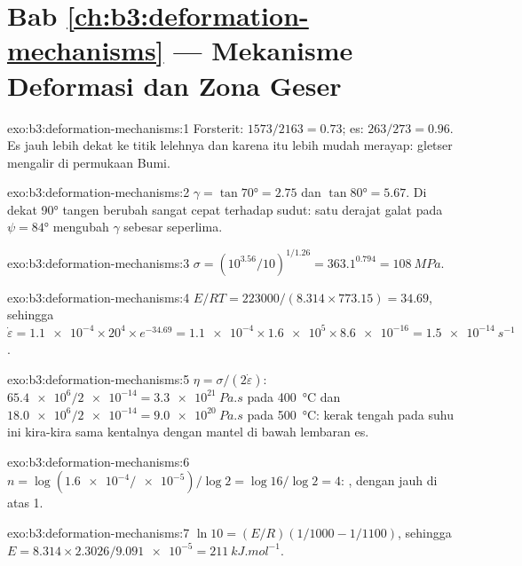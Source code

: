 \section*{Bab \ref{ch:b3:deformation-mechanisms} --- Mekanisme Deformasi dan Zona Geser}

\begin{solution}{exo:b3:deformation-mechanisms:1}
Forsterit: $1573/2163 = 0.73$; es: $263/273 = 0.96$. Es jauh lebih dekat ke
titik lelehnya dan karena itu lebih mudah merayap: gletser mengalir di
permukaan Bumi.
\end{solution}

\begin{solution}{exo:b3:deformation-mechanisms:2}
$\gamma = \tan\ang{70} = 2.75$ dan $\tan\ang{80} = 5.67$. Di dekat \ang{90}
tangen berubah sangat cepat terhadap sudut: satu derajat galat pada $\psi =
\ang{84}$ mengubah $\gamma$ sebesar seperlima.
\end{solution}

\begin{solution}{exo:b3:deformation-mechanisms:3}
$\sigma = (10^{3.56}/10)^{1/1.26} = 363.1^{0.794} = \qty{108}{MPa}$.
\end{solution}

\begin{solution}{exo:b3:deformation-mechanisms:4}
$E/RT = 223000/(8.314\times773.15) = 34.69$, sehingga $\dot\varepsilon =
\num{1.1e-4}\times20^4\times e^{-34.69} = \num{1.1e-4}\times\num{1.6e5}\times
\num{8.6e-16} = \qty{1.5e-14}{s^{-1}}$.
\end{solution}

\begin{solution}{exo:b3:deformation-mechanisms:5}
$\eta = \sigma/(2\dot\varepsilon)$: $\num{65.4e6}/\num{2e-14} =
\qty{3.3e21}{Pa.s}$ pada \qty{400}{\celsius} dan $\num{18.0e6}/\num{2e-14} =
\qty{9.0e20}{Pa.s}$ pada \qty{500}{\celsius}: kerak tengah pada suhu ini
kira-kira sama kentalnya dengan mantel di bawah lembaran es.
\end{solution}

\begin{solution}{exo:b3:deformation-mechanisms:6}
$n = \log(\num{1.6e-4}/\num{e-5})/\log2 = \log16/\log2 = 4$: ,
dengan  jauh di atas 1.
\end{solution}

\begin{solution}{exo:b3:deformation-mechanisms:7}
$\ln10 = (E/R)(1/1000 - 1/1100)$, sehingga $E = 8.314\times2.3026/\num{9.091e-5} =
\qty{211}{kJ.mol^{-1}}$.
\end{solution}


